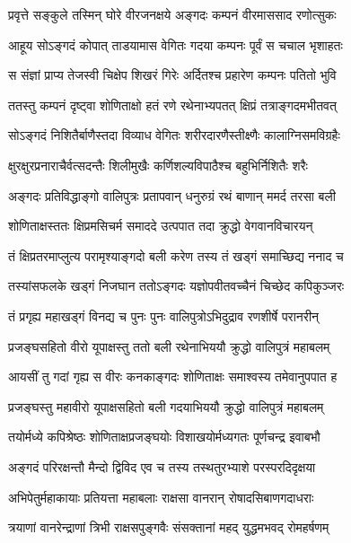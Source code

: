 
\twolineshloka
{प्रवृत्ते सङ्कुले तस्मिन् घोरे वीरजनक्षये}
{अङ्गदः कम्पनं वीरमाससाद रणोत्सुकः} %

\twolineshloka
{आहूय सोऽङ्गदं कोपात् ताडयामास वेगितः}
{गदया कम्पनः पूर्वं स चचाल भृशाहतः} %

\twolineshloka
{स संज्ञां प्राप्य तेजस्वी चिक्षेप शिखरं गिरेः}
{अर्दितश्च प्रहारेण कम्पनः पतितो भुवि} %

\twolineshloka
{ततस्तु कम्पनं दृष्ट्वा शोणिताक्षो हतं रणे}
{रथेनाभ्यपतत् क्षिप्रं तत्राङ्गदमभीतवत्} %

\twolineshloka
{सोऽङ्गदं निशितैर्बाणैस्तदा विव्याध वेगितः}
{शरीरदारणैस्तीक्ष्णैः कालाग्निसमविग्रहैः} %

\twolineshloka
{क्षुरक्षुरप्रनाराचैर्वत्सदन्तैः शिलीमुखैः}
{कर्णिशल्यविपाठैश्च बहुभिर्निशितैः शरैः} %

\twolineshloka
{अङ्गदः प्रतिविद्धाङ्गो वालिपुत्रः प्रतापवान्}
{धनुरुग्रं रथं बाणान् ममर्द तरसा बली} %

\twolineshloka
{शोणिताक्षस्ततः क्षिप्रमसिचर्म समाददे}
{उत्पपात तदा क्रुद्धो वेगवानविचारयन्} %

\twolineshloka
{तं क्षिप्रतरमाप्लुत्य परामृश्याङ्गदो बली}
{करेण तस्य तं खड्गं समाच्छिद्य ननाद च} %

\twolineshloka
{तस्यांसफलके खड्गं निजघान ततोऽङ्गदः}
{यज्ञोपवीतवच्चैनं चिच्छेद कपिकुञ्जरः} %

\twolineshloka
{तं प्रगृह्य महाखड्गं विनद्य च पुनः पुनः}
{वालिपुत्रोऽभिदुद्राव रणशीर्षे परानरीन्} %

\twolineshloka
{प्रजङ्घसहितो वीरो यूपाक्षस्तु ततो बली}
{रथेनाभिययौ क्रुद्धो वालिपुत्रं महाबलम्} %

\twolineshloka
{आयसीं तु गदां गृह्य स वीरः कनकाङ्गदः}
{शोणिताक्षः समाश्वस्य तमेवानुपपात ह} %

\twolineshloka
{प्रजङ्घस्तु महावीरो यूपाक्षसहितो बली}
{गदयाभिययौ क्रुद्धो वालिपुत्रं महाबलम्} %

\twolineshloka
{तयोर्मध्ये कपिश्रेष्ठः शोणिताक्षप्रजङ्घयोः}
{विशाखयोर्मध्यगतः पूर्णचन्द्र इवाबभौ} %

\twolineshloka
{अङ्गदं परिरक्षन्तौ मैन्दो द्विविद एव च}
{तस्य तस्थतुरभ्याशे परस्परदिदृक्षया} %

\twolineshloka
{अभिपेतुर्महाकायाः प्रतियत्ता महाबलाः}
{राक्षसा वानरान् रोषादसिबाणगदाधराः} %

\twolineshloka
{त्रयाणां वानरेन्द्राणां त्रिभी राक्षसपुङ्गवैः}
{संसक्तानां महद् युद्धमभवद् रोमहर्षणम्} %

